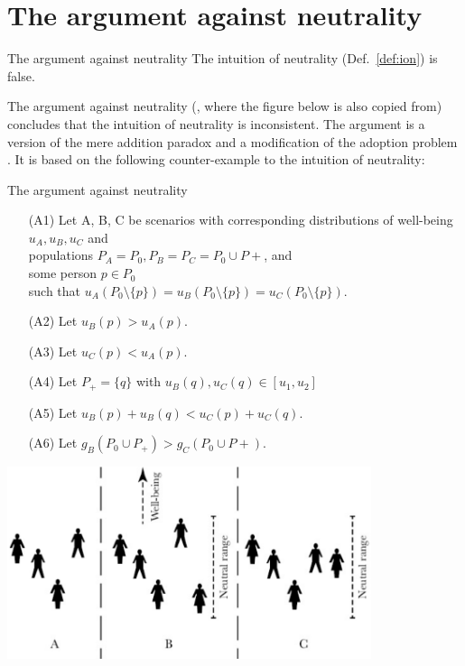\section{The argument against neutrality}

\begin{Theorem}{The argument against neutrality}{}
The intuition of neutrality (Def.~\ref{def:ion}) is false.
\end{Theorem}

The argument against neutrality (, where the figure below is also copied from) concludes that the intuition of neutrality is inconsistent. The argument is a version of the mere addition paradox \cite[p.~148]{broome_2004} and a modification of the adoption problem \cite[p.~161]{broome_2004}. It is based on the following counter-example to the intuition of neutrality:  

\begin{Scenario}{The argument against neutrality}{}
\begin{enumerate}
\item[(A1)]
Let A, B, C be scenarios with  
corresponding distributions of well-being $u_A, u_B, u_C$ and \\
populations $P_A = P_0, P_B = P_C = P_0 \cup P+$, and \\
some person $p \in P_0$ \\
such that $u_A(P_0 \setminus \{p\}) = u_B(P_0 \setminus \{p\}) = u_C(P_0 \setminus \{p\}).$
\item[(A2)] Let $u_B(p) > u_A(p).$
\item[(A3)] Let $u_C(p) < u_A(p).$
\item[(A4)] Let $P_+ = \{q\}$ with $u_B(q), u_C(q) \in [u_1, u_2]$
\item[(A5)] Let $u_B(p) + u_B(q) < u_C(p) + u_C(q).$
\item[(A6)] Let $g_B(P_0 \cup P_+) > g_C(P_0 \cup P+)$. 
\end{enumerate}
\begin{center}
  \includegraphics[width=0.8\textwidth]{3-fig-1}
\end{center}
\end{Scenario}

